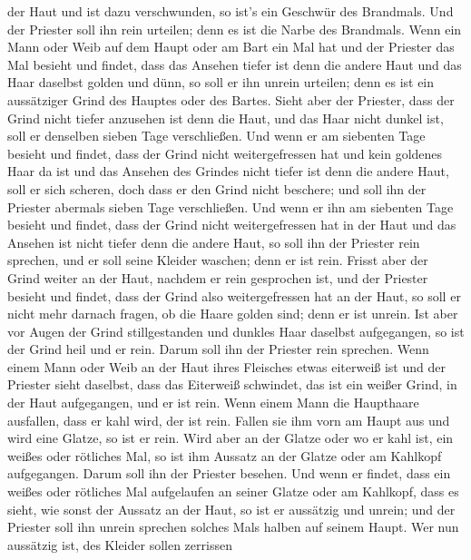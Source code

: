 der Haut und ist dazu verschwunden, so ist's ein Geschwür des Brandmals.
Und der Priester soll ihn rein urteilen; denn es ist die Narbe des
Brandmals.  Wenn ein Mann oder Weib auf dem Haupt oder am
Bart ein Mal hat  und der Priester das Mal besieht und
findet, dass das Ansehen tiefer ist denn die andere Haut und das Haar
daselbst golden und dünn, so soll er ihn unrein urteilen; denn es ist
ein aussätziger Grind des Hauptes oder des Bartes.  Sieht
aber der Priester, dass der Grind nicht tiefer anzusehen ist denn die
Haut, und das Haar nicht dunkel ist, soll er denselben sieben Tage
verschließen.  Und wenn er am siebenten Tage besieht und
findet, dass der Grind nicht weitergefressen hat und kein goldenes Haar
da ist und das Ansehen des Grindes nicht tiefer ist denn die andere
Haut,  soll er sich scheren, doch dass er den Grind nicht
beschere; und soll ihn der Priester abermals sieben Tage verschließen.
 Und wenn er ihn am siebenten Tage besieht und findet, dass
der Grind nicht weitergefressen hat in der Haut und das Ansehen ist
nicht tiefer denn die andere Haut, so soll ihn der Priester rein
sprechen, und er soll seine Kleider waschen; denn er ist rein.
 Frisst aber der Grind weiter an der Haut, nachdem er rein
gesprochen ist,  und der Priester besieht und findet, dass
der Grind also weitergefressen hat an der Haut, so soll er nicht mehr
darnach fragen, ob die Haare golden sind; denn er ist unrein.
 Ist aber vor Augen der Grind stillgestanden und dunkles
Haar daselbst aufgegangen, so ist der Grind heil und er rein. Darum soll
ihn der Priester rein sprechen.  Wenn einem Mann oder Weib
an der Haut ihres Fleisches etwas eiterweiß ist  und der
Priester sieht daselbst, dass das Eiterweiß schwindet, das ist ein
weißer Grind, in der Haut aufgegangen, und er ist rein. 
Wenn einem Mann die Haupthaare ausfallen, dass er kahl wird, der ist
rein.  Fallen sie ihm vorn am Haupt aus und wird eine
Glatze, so ist er rein.  Wird aber an der Glatze oder wo er
kahl ist, ein weißes oder rötliches Mal, so ist ihm Aussatz an der
Glatze oder am Kahlkopf aufgegangen.  Darum soll ihn der
Priester besehen. Und wenn er findet, dass ein weißes oder rötliches Mal
aufgelaufen an seiner Glatze oder am Kahlkopf, dass es sieht, wie sonst
der Aussatz an der Haut,  so ist er aussätzig und unrein;
und der Priester soll ihn unrein sprechen solches Mals halben auf seinem
Haupt.  Wer nun aussätzig ist, des Kleider sollen zerrissen
